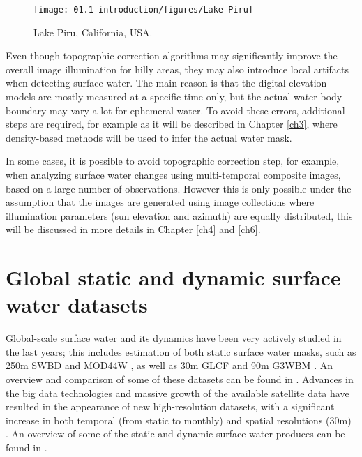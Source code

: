 \begin{figure}
	\begin{center}
		\texttt{[image: 01.1-introduction/figures/Lake-Piru]}
	\end{center}
	\caption{Lake Piru, California, USA. \protect \footnotemark}
\end{figure}


Even though topographic correction algorithms may significantly improve the overall image illumination for hilly areas, they may also introduce local artifacts when detecting surface water. The main reason is that the digital elevation models are mostly measured at a specific time only, but the actual water body boundary may vary a lot for ephemeral water. To avoid these errors, additional steps are required, for example as it will be described in Chapter \ref{ch3}, where density-based methods will be used to infer the actual water mask.

In some cases, it is possible to avoid topographic correction step, for example, when analyzing surface water changes using multi-temporal composite images, based on a large number of observations. However this is only possible under the assumption that the images are generated using image collections where illumination parameters (sun elevation and azimuth) are equally distributed, this will be discussed in more details in Chapter \ref{ch4} and \ref{ch6}.


\section{Global static and dynamic surface water datasets}
Global-scale surface water and its dynamics have been very actively studied in the last years; this includes estimation of both static surface water masks, such as 250m SWBD \citep{farr2007shuttle} and MOD44W \citep{carroll2009new}, as well as 30m GLCF \citep{feng2016global} and 90m G3WBM \citep{yamazaki2015development}. An overview and comparison of some of these datasets can be found in \citep{lamarche2017compilation}. Advances in the big data technologies and massive growth of the available satellite data have resulted in the appearance of new high-resolution datasets, with a significant increase in both temporal (from static to monthly) and spatial resolutions (30m) \citep{pekel2016high}. An overview of some of the static and dynamic surface water produces can be found in \citep{yamazaki2016hydrology}. 

